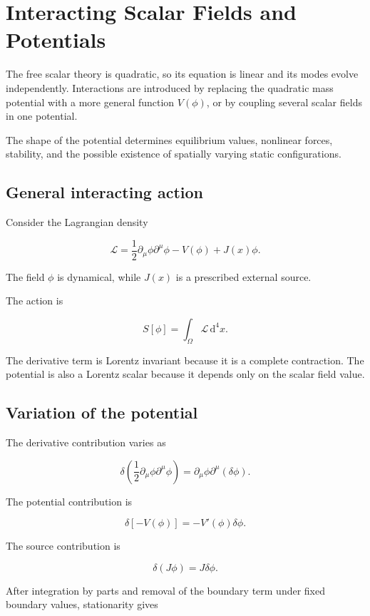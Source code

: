 \section{Interacting Scalar Fields and Potentials}
\label{sec:interacting_scalar_fields_and_potentials}

The free scalar theory is quadratic, so its equation is linear and its modes evolve independently. Interactions are introduced by replacing the quadratic mass potential with a more general function \(V(\phi)\), or by coupling several scalar fields in one potential.

The shape of the potential determines equilibrium values, nonlinear forces, stability, and the possible existence of spatially varying static configurations.

\subsection{General interacting action}

Consider the Lagrangian density

\[
\boxed{
\mathcal{L}
=
\frac{1}{2}
\partial_{\mu}\phi\partial^{\mu}\phi
-
V(\phi)
+
J(x)\phi
}.
\]

The field \(\phi\) is dynamical, while \(J(x)\) is a prescribed external source.

The action is

\[
S[\phi]
=
\int_{\Omega}
\mathcal{L}
\,\mathrm{d}^{4}x.
\]

The derivative term is Lorentz invariant because it is a complete contraction. The potential is also a Lorentz scalar because it depends only on the scalar field value.

\subsection{Variation of the potential}

The derivative contribution varies as

\[
\delta
\left(
\frac{1}{2}
\partial_{\mu}\phi\partial^{\mu}\phi
\right)
=
\partial_{\mu}\phi
\partial^{\mu}(\delta\phi).
\]

The potential contribution is

\[
\delta[-V(\phi)]
=
-V'(\phi)\delta\phi.
\]

The source contribution is

\[
\delta(J\phi)
=
J\delta\phi.
\]

After integration by parts and removal of the boundary term under fixed boundary values, stationarity gives

